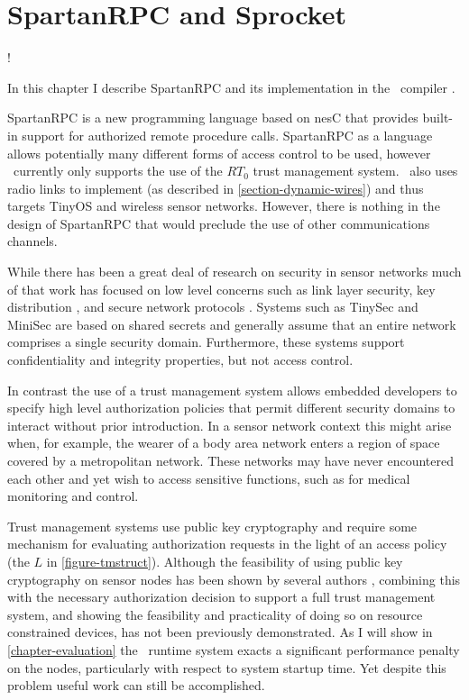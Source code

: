 
\chapter{SpartanRPC and Sprocket}
\label{chapter-spartanrpc-sprocket}

\lstset{language=nesC}
\lstMakeShortInline[basicstyle=\ttfamily]!

In this chapter I describe SpartanRPC \cite{chapin-skalka-SpartanRPC,chapin-skalka-SpartanRPCTR}
and its implementation in the \Sprocket\ compiler \cite{sprocket}.

SpartanRPC is a new programming language based on nesC that provides built-in support for
authorized remote procedure calls. SpartanRPC as a language allows potentially many different
forms of access control to be used, however \Sprocket\ currently only supports the use of the
$RT_0$ trust management system. \Sprocket\ also uses radio links to implement  (as described in \autoref{section-dynamic-wires}) and thus targets TinyOS and wireless
sensor networks. However, there is nothing in the design of SpartanRPC that would preclude the
use of other communications channels.

While there has been a great deal of research on security in sensor networks much of that work
has focused on low level concerns such as link layer security, key distribution
\cite{camtepe-bulent-05}, and secure network protocols \cite{1049776,fouladgar-3tls-2006}.
Systems such as TinySec \cite{karlog-tinysec-2004} and MiniSec \cite{luk-minisec-2007} are based
on shared secrets and generally assume that an entire network comprises a single security
domain. Furthermore, these systems support confidentiality and integrity properties, but not
access control.

In contrast the use of a trust management system allows embedded developers to specify high
level authorization policies that permit different security domains to interact without prior
introduction. In a sensor network context this might arise when, for example, the wearer of a
body area network enters a region of space covered by a metropolitan network. These networks may
have never encountered each other and yet wish to access sensitive functions, such as for
medical monitoring and control.

Trust management systems use public key cryptography and require some mechanism for evaluating
authorization requests in the light of an access policy (the $L$ in \autoref{figure-tmstruct}).
Although the feasibility of using public key cryptography on sensor nodes has been shown by
several authors
\cite{1049776,Malan:2008:IPI:1387663.1387668,bertoni-2006,kumar-2006,4604657,Liu-Peng-TinyECC-2008,Szczechowiak:2008:NTL:1786014.1786040},
combining this with the necessary authorization decision to support a full trust management
system, and showing the feasibility and practicality of doing so on resource constrained
devices, has not been previously demonstrated. As I will show in \autoref{chapter-evaluation}
the \Sprocket\ runtime system exacts a significant performance penalty on the nodes,
particularly with respect to system startup time. Yet despite this problem useful work can still
be accomplished.

